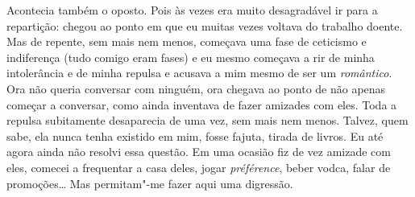 Acontecia também o oposto. Pois às vezes era muito desagradável ir para
a repartição: chegou ao ponto em que eu muitas vezes voltava do
trabalho doente. Mas de repente, sem mais nem menos, começava uma fase
de ceticismo e indiferença (tudo comigo eram fases) e eu mesmo
começava a rir de minha intolerância e de minha repulsa e acusava a mim
mesmo de ser um \textit{romântico}. Ora não queria conversar com
ninguém, ora chegava ao ponto de não apenas começar a conversar, como
ainda inventava de fazer amizades com eles. Toda a repulsa subitamente
desaparecia de uma vez, sem mais nem menos. Talvez, quem sabe, ela
nunca tenha existido em mim, fosse fajuta, tirada de livros. Eu até
agora ainda não resolvi essa questão. Em uma ocasião fiz de vez amizade
com eles, comecei a frequentar a casa deles, jogar \textit{préférence},
beber vodca, falar de promoções\ldots{} Mas permitam"-me fazer aqui uma
digressão.

